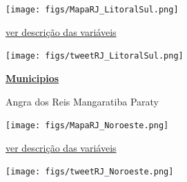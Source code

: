 \documentclass[10pt]{article} %
\begin{document}

\begin{minipage}[t]{.66\linewidth}
\hypertarget{LtrS}{}
\texttt{[image: figs/MapaRJ\_LitoralSul.png]}\vspace{0.5cm}\begin{center}

\end{center}
\small{\hyperlink{vartab}{ver descrição das variáveis}}\vspace{0.5cm}\begin{center}
\texttt{[image: figs/tweetRJ\_LitoralSul.png]}\end{center}
\end{minipage}\hfill\begin{minipage}[t]{.30\linewidth}
\begin{mdframed}[style=sidebar,frametitle={}]
\textbf{\hyperlink{municips}{Municipios}}\begin{itemize}\gsquare Angra dos Reis 
\ysquare Mangaratiba 
\gsquare Paraty 
\end{itemize}\BackToContents\end{mdframed}\hfill\end{minipage}\newpage\begin{minipage}[t]{.66\linewidth}
\hypertarget{Nrst}{}
\texttt{[image: figs/MapaRJ\_Noroeste.png]}\vspace{0.5cm}\begin{center}

\end{center}
\small{\hyperlink{vartab}{ver descrição das variáveis}}\vspace{0.5cm}\begin{center}
\texttt{[image: figs/tweetRJ\_Noroeste.png]}\end{center}
\end{minipage}\hfill\begin{minipage}[t]{.30\linewidth}

\end{minipage}
\end{document}
